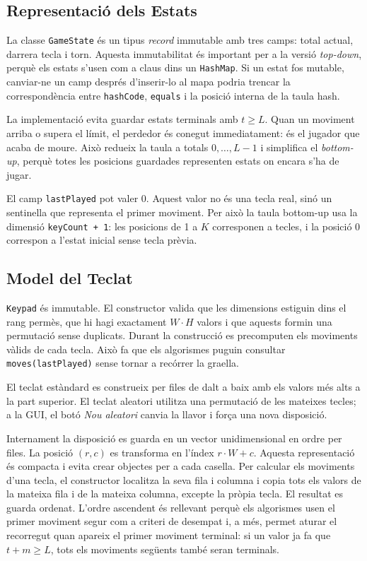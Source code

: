 \documentclass[conference,compsoc]{IEEEtran}
\begin{document}
\subsection{Representació dels Estats}

La classe \texttt{GameState} és un tipus \textit{record} immutable amb tres camps: total actual,
darrera tecla i torn. Aquesta immutabilitat és important per a la versió
\textit{top-down}, perquè els estats s'usen com a claus dins un \texttt{HashMap}.
Si un estat fos mutable, canviar-ne un camp després d'inserir-lo al mapa podria
trencar la correspondència entre \texttt{hashCode}, \texttt{equals} i la posició
interna de la taula hash.

La implementació evita guardar estats terminals amb $t\geq L$. Quan un moviment
arriba o supera el límit, el perdedor és conegut immediatament: és el jugador
que acaba de moure. Això redueix la taula a totals $0,\ldots,L-1$ i simplifica
el \textit{bottom-up}, perquè totes les posicions guardades representen estats on
encara s'ha de jugar.

El camp \texttt{lastPlayed} pot valer 0. Aquest valor no és una tecla real, sinó
un sentinella que representa el primer moviment. Per això la taula bottom-up usa
la dimensió \texttt{keyCount + 1}: les posicions de 1 a $K$ corresponen a tecles,
i la posició 0 correspon a l'estat inicial sense tecla prèvia.

\subsection{Model del Teclat}

\texttt{Keypad} és immutable. El constructor valida que les dimensions estiguin
dins el rang permès, que hi hagi exactament $W\cdot H$ valors i que aquests
formin una permutació sense duplicats. Durant la construcció es precomputen els
moviments vàlids de cada tecla. Això fa que els algorismes puguin consultar
\texttt{moves(lastPlayed)} sense tornar a recórrer la graella.

El teclat estàndard es construeix per files de dalt a baix amb els valors més
alts a la part superior. El teclat aleatori utilitza una permutació de les mateixes
tecles; a la GUI, el botó \textit{Nou aleatori} canvia la llavor i força una nova
disposició.

Internament la disposició es guarda en un vector unidimensional en ordre per files.
La posició $(r,c)$ es transforma en l'índex $r\cdot W+c$. Aquesta representació
és compacta i evita crear objectes per a cada casella. Per calcular els moviments
d'una tecla, el constructor localitza la seva fila i columna i copia tots els
valors de la mateixa fila i de la mateixa columna, excepte la pròpia tecla. El
resultat es guarda ordenat. L'ordre ascendent és rellevant perquè els algorismes
usen el primer moviment segur com a criteri de desempat i, a més, permet aturar
el recorregut quan apareix el primer moviment terminal: si un valor ja fa que
$t+m\geq L$, tots els moviments següents també seran terminals.
\end{document}
